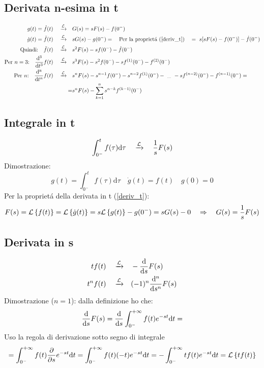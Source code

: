 \documentclass[../main.tex]{subfiles}
\begin{document}
	\subsection{Derivata n-esima in t}
	\label{deriv_n_t}
	\begin{align*}
		g(t)=\dot{f}(t) \quad \xrightarrow{\mathcal{L}} \quad &G(s) = sF(s) - f(0^{-})\\
		\dot{g}(t) = \ddot{f}(t) \quad \xrightarrow{\mathcal{L}} \quad &sG(s) - g(0^{-})= \quad \text{Per la propriet\'{a} (\ref{deriv_t})} \quad
		=\ s[sF(s) - f(0^{-})] - \dot{f}(0^{-})\\
		\text{Quindi:} \quad \ddot{f}(t) \quad \xrightarrow{\mathcal{L}} \quad &s^2 F(s) - s f(0^{-}) - \dot{f}(0^{-}) \\
		\text{Per } n=3 \text{:} \quad \frac{\mathrm{d^3}}{\mathrm{d}t^3}f(t) \quad \xrightarrow{\mathcal{L}} \quad &s^3 F(s) - s^2 f(0^{-}) - s f^{(1)}(0^{-}) - f^{(2)}(0^{-}) \\
		\text{Per } n \text{:} \quad		\frac{\mathrm{d^n}}{\mathrm{d}t^n}f(t) \quad \xrightarrow{\mathcal{L}} \quad &s^n F(s) - s^{n-1} f(0^{-}) - s^{n-2} f^{(1)}(0^{-}) -\ _{\dots}\ - s f^{(n-2)}(0^{-}) - f^{(n-1)}(0^{-}) = \\
		= &s^n F(s) - \sum_{k = 1}^{n} s^{n-k} f^{(k - 1)}(0^{-})
	\end{align*}
	\subsection{Integrale in t}
	\label{int_t}
	$$ \int_{0^{-}}^{t} f(\tau) \mathrm{d}\tau \quad \xrightarrow{\mathcal{L}} \quad \frac{1}{s} F(s) $$
	Dimostrazione:
	$$ g(t) = \int_{0^{-}}^{t} f(\tau) \mathrm{d}\tau \quad 		\dot{g}(t) = f(t) \quad g(0) = 0 $$
	Per la propriet\'{a} della derivata in t (\ref{deriv_t}):
	$$ 	F(s) = \mathcal{L} \left\lbrace f(t) \right\rbrace = \mathcal{L} \left\lbrace \dot{g}(t) \right\rbrace = s \mathcal{L} \left\lbrace g(t) \right\rbrace - g(0^{-}) = s G(s) - 0 \quad \Rightarrow \quad G(s) = \frac{1}{s} F(s) $$
	\subsection{Derivata in s}
	\label{deriv_s}
	\begin{align*}
	t f(t) \quad \xrightarrow{\mathcal{L}} \quad &- \frac{\mathrm{d}}{\mathrm{d}s} F(s)\\
	t^n f(t) \quad \xrightarrow{\mathcal{L}} \quad &(-1)^n \frac{\mathrm{d}^n}{\mathrm{d}s^n} F(s)
	\end{align*}
	Dimostrazione ($n=1$): dalla definizione ho che:
	\[
		\frac{\mathrm{d}}{\mathrm{d}s} F(s) = \frac{\mathrm{d}}{\mathrm{d}s} \int_{0^{-}}^{+\infty} f(t) e^{- s t} \mathrm{d} t =
	\]
	Uso la regola di derivazione sotto segno di integrale
	\[
		= \int_{0^{-}}^{+\infty} f(t) \frac{\partial }{\partial s} e^{- s t} \mathrm{d} t = \int_{0^{-}}^{+\infty} f(t)(-t) e^{- s t} \mathrm{d} t = - \int_{0^{-}}^{+\infty} t f(t) e^{- s t} \mathrm{d} t=\mathcal{L} \left\lbrace t f(t) \right\rbrace
	\]
\end{document}
